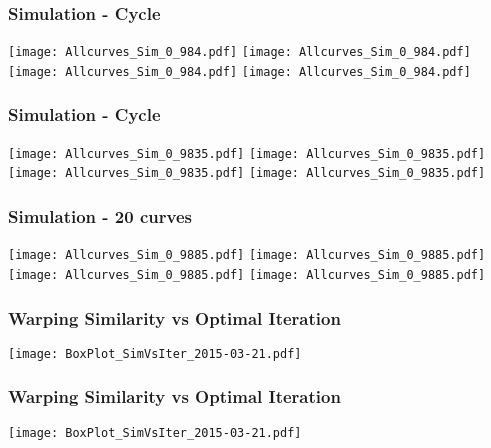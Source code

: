 \documentclass[10pt,dvipsnames,table]{beamer}
\begin{document}
\begin{frame}
\frametitle{Simulation - Cycle}
\begin{center}
\texttt{[image: Allcurves\_Sim\_0\_984.pdf]}
\texttt{[image: Allcurves\_Sim\_0\_984.pdf]} \\
\texttt{[image: Allcurves\_Sim\_0\_984.pdf]}
\texttt{[image: Allcurves\_Sim\_0\_984.pdf]}
\end{center}
\end{frame}

\begin{frame}
\frametitle{Simulation - Cycle}
\begin{center}
\texttt{[image: Allcurves\_Sim\_0\_9835.pdf]}
\texttt{[image: Allcurves\_Sim\_0\_9835.pdf]} \\
\texttt{[image: Allcurves\_Sim\_0\_9835.pdf]}
\texttt{[image: Allcurves\_Sim\_0\_9835.pdf]}
\end{center}
\end{frame}

\begin{frame}
\frametitle{Simulation - 20 curves}
\begin{center}
\texttt{[image: Allcurves\_Sim\_0\_9885.pdf]}
\texttt{[image: Allcurves\_Sim\_0\_9885.pdf]} \\
\texttt{[image: Allcurves\_Sim\_0\_9885.pdf]}
\texttt{[image: Allcurves\_Sim\_0\_9885.pdf]}
\end{center}
\end{frame}

\begin{frame}
\frametitle{Warping Similarity vs Optimal Iteration}
\begin{center}
\texttt{[image: BoxPlot\_SimVsIter\_2015-03-21.pdf]} 
\end{center}
\end{frame}

\begin{frame}
\frametitle{Warping Similarity vs Optimal Iteration}
\begin{center}
\texttt{[image: BoxPlot\_SimVsIter\_2015-03-21.pdf]} 
\end{center}
\end{frame}
\end{document}
